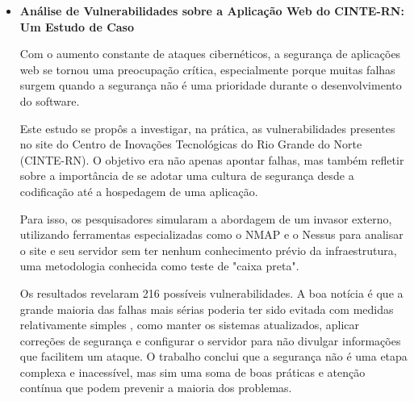 \documentclass[12pt]{article}
\begin{document}
\begin{itemize}
O estudo teve como objetivo identificar e classificar vulnerabilidades presentes em um sistema web por meio da ferramenta OWASP ZAP, 
adotando como referência o OWASP Top 10. A pesquisa buscou demonstrar como falhas simples de configuração ou validação de entrada podem expor dados sensíveis e comprometer todo o sistema.

Durante o desenvolvimento, o autor realizou testes práticos em uma aplicação web, aplicando técnicas de varredura automatizada e inspeção manual. 
As vulnerabilidades encontradas foram analisadas quanto à gravidade e ao impacto, e foram sugeridas medidas corretivas como sanitização de entradas, uso de HTTPS, 
e gerenciamento adequado de sessões.

O trabalho conclui que o uso de ferramentas como o OWASP ZAP é fundamental para a detecção precoce de falhas, 
permitindo que desenvolvedores corrijam problemas antes que sejam explorados por atacantes. 
Sampaio reforça a necessidade de incorporar práticas de teste de segurança contínuo no ciclo de desenvolvimento de software.

    \item \textbf{Análise de Vulnerabilidades sobre a Aplicação Web do CINTE-RN: Um Estudo de Caso \cite{duarte2020}}
    
Com o aumento constante de ataques cibernéticos, a segurança de aplicações web se tornou uma preocupação crítica, especialmente porque muitas falhas surgem quando a 
segurança não é uma prioridade durante o desenvolvimento do software.

Este estudo se propôs a investigar, na prática, as vulnerabilidades presentes no site do Centro de Inovações Tecnológicas do Rio Grande do Norte (CINTE-RN). 
O objetivo era não apenas apontar falhas, mas também refletir sobre a importância de se adotar uma cultura de segurança desde a codificação até a hospedagem de uma aplicação.

Para isso, os pesquisadores simularam a abordagem de um invasor externo, utilizando ferramentas especializadas como o NMAP e o
Nessus para analisar o site e seu servidor sem ter nenhum conhecimento prévio da infraestrutura, uma metodologia conhecida como teste de "caixa preta".

Os resultados revelaram 216 possíveis vulnerabilidades. A boa notícia é que a grande maioria das falhas mais sérias poderia ter sido evitada com medidas relativamente simples
, como manter os sistemas atualizados, aplicar correções de segurança e configurar o servidor para não divulgar informações que facilitem um ataque. 
O trabalho conclui que a segurança não é uma etapa complexa e inacessível, mas sim uma soma de boas práticas e atenção contínua que podem prevenir a maioria dos problemas.
    

\end{itemize}
\end{document}
